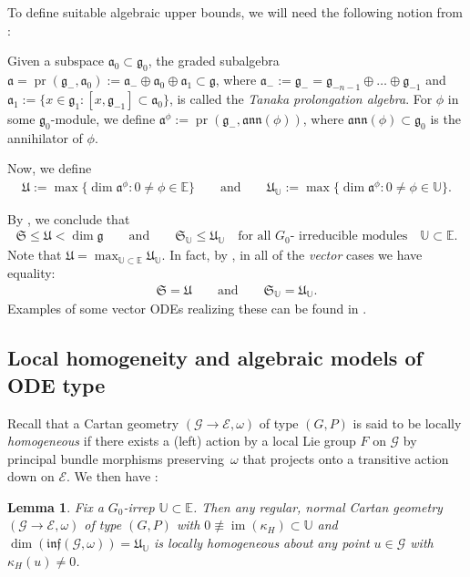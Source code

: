 \documentclass[10pt,a4paper]{amsart}
\DeclareMathOperator{\pr}{pr}
\DeclareMathOperator{\img}{im}
\newcommand{\g}{\mathfrak{g}}
\newcommand\cG{\mathcal{G}}
\newcommand\fa{\mathfrak{a}}
\newcommand\fann{\mathfrak{ann}}
\newcommand\finf{\mathfrak{inf}}
\newcommand\fS{\mathfrak{S}}
\newcommand\fU{\mathfrak{U}}
\newcommand\bbE{\mathbb{E}}
\newcommand\bbU{\mathbb{U}}
\newcommand\cE{\mathcal{E}}
\numberwithin{equation}{section}
\newtheorem{Lemma}[Theorem]{Lemma}
\begin{document}
To define suitable algebraic upper bounds, we will need the following notion from \cite{KT2017}:
\begin{Definition} \label{D:TA}
Given a subspace $\fa_0 \subset \g_0$, the graded subalgebra $\fa = \pr(\g_-,\fa_0) := \fa_- \oplus \fa_0 \oplus \fa_1 \subset \g$, where $\fa_- :=\g_- = \g_{-n-1} \oplus \dots \oplus \g_{-1}$ and $\fa_1 :=\{x \in \g_1\colon [x,\g_{-1}] \subset \fa_0\}$, is called the {\em Tanaka prolongation algebra}. For $\phi$ in some $\g_0$-module, we define $\fa^\phi := \pr(\g_-,\fann(\phi))$, where $\fann (\phi) \subset \g_0$ is the annihilator of $\phi$.
\end{Definition}
Now, we define
\begin{align}\label{E:UU}
\fU := \max \bigl\{\dim \fa^\phi \colon 0 \ne \phi \in \bbE \bigr\} \qquad \text{and} \qquad \fU_\bbU := \max \bigl\{\dim \fa^\phi\colon 0 \ne \phi \in \bbU \bigr\}.
\end{align}

By \cite[Theorem~2.11]{KT2021}, we conclude that
\begin{align} \label{E:SU}
\fS \le \fU < \dim \g \qquad \text{and}\qquad \fS_\bbU \le \fU_\bbU \quad \text{for all $G_0$- irreducible modules}\quad \bbU \subset \bbE.
\end{align}
Note that $\fU = \max_{\bbU \subset \bbE} \fU_\bbU$. In fact, by \cite[Theorem~1.2]{KT2021}, in all of the {\em vector} cases we have equality:
\begin{align*}
\fS = \fU \qquad \text{and} \qquad \fS_\bbU = \fU_\bbU.
\end{align*}
Examples of some vector ODEs realizing these can be found in \cite[Tables 8 and~10]{KT2021}.

\subsection{Local homogeneity and algebraic models of ODE type}\label{S:AlgM}
Recall that a Cartan geometry $(\cG \to \cE, \omega)$ of type $(G,P)$ is said to be locally {\em homogeneous} if there exists a (left) action by a local Lie group $F$ on $\cG$ by principal bundle morphisms preserving~$\omega$ that projects onto a transitive action down on $\cE$. We then have \cite[Lemma~A.1]{KT2021}:
\begin{Lemma}\label{L:LoHom}
Fix a $G_0$-irrep $\bbU \subset \bbE$. Then any regular, normal Cartan geometry $(\cG \to \cE, \omega)$ of type $(G,P)$ with $ 0 \not\equiv \img(\kappa_H) \subset \bbU$ and $\dim (\finf(\cG, \omega)) = \fU_\bbU$ is locally homogeneous about any point $u \in \cG$ with $\kappa_H(u) \ne 0$.	
\end{Lemma}
\end{document}
